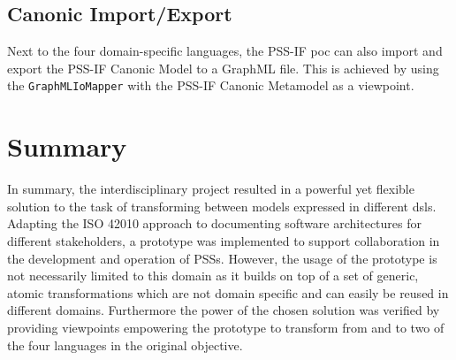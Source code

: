 \subsection{Canonic Import/Export}

Next to the four domain-specific languages, the PSS-IF \gls{poc} can also import and export the PSS-IF Canonic Model to a GraphML file. This is achieved by using the \texttt{GraphMLIoMapper} with the PSS-IF Canonic Metamodel as a viewpoint.


\section{Summary}
\label{sec:results:summary}

In summary, the interdisciplinary project resulted in a powerful yet flexible solution to the task of transforming between models expressed in different \glspl{dsl}. Adapting the ISO 42010 approach \cite{ref:42010} to documenting software architectures for different stakeholders, a prototype was implemented to support collaboration in the development and operation of \glspl{PSS}. However, the usage of the prototype is not necessarily limited to this domain as it builds on top of a set of generic, atomic transformations which are not domain specific and can easily be reused in different domains. Furthermore the power of the chosen solution was verified by providing viewpoints empowering the prototype to transform from and to two of the four languages in the original objective.